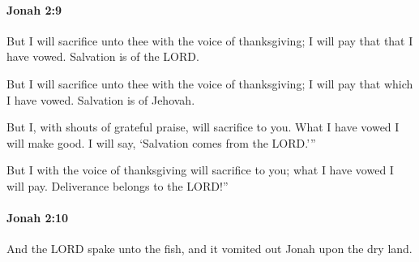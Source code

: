 		\paragraph{Jonah 2:9} %
			\label{JONAH-2-9}

			But I will sacrifice unto thee with the voice of thanksgiving; I will pay that that I have vowed. Salvation is of the LORD.

			\begin{versebox}
					\item[BHS] 
					\item[LXX] 
					\item[ASV] But I will sacrifice unto thee with the voice of thanksgiving; I will pay that which I have vowed. Salvation is of Jehovah.
					\item[NIV] But I, with shouts of grateful praise, will sacrifice to you. What I have vowed I will make good. I will say, ‘Salvation comes from the LORD.’”
					\item[NRSV] But I with the voice of thanksgiving will sacrifice to you; what I have vowed I will pay. Deliverance belongs to the LORD!”
			\end{versebox}

		\paragraph{Jonah 2:10} %
			\label{JONAH-2-10}

			And the LORD spake unto the fish, and it vomited out Jonah upon the dry land.


